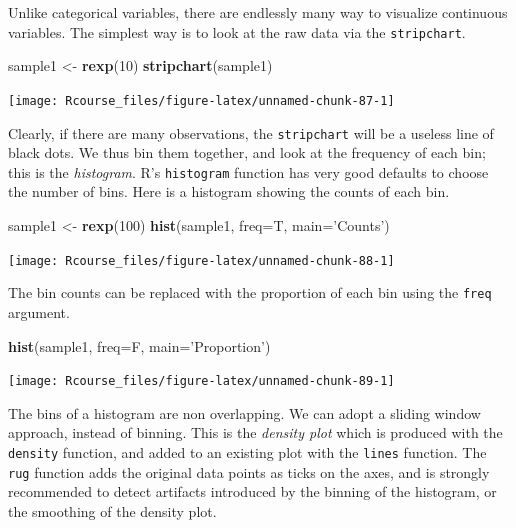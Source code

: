 \documentclass[]{book}
\newenvironment{Shaded}{\begin{snugshade}}{\end{snugshade}}
\newcommand{\KeywordTok}[1]{\textcolor[rgb]{0.13,0.29,0.53}{\textbf{#1}}}
\newcommand{\DataTypeTok}[1]{\textcolor[rgb]{0.13,0.29,0.53}{#1}}
\newcommand{\DecValTok}[1]{\textcolor[rgb]{0.00,0.00,0.81}{#1}}
\newcommand{\StringTok}[1]{\textcolor[rgb]{0.31,0.60,0.02}{#1}}
\newcommand{\NormalTok}[1]{#1}
\theoremstyle{definition}
\theoremstyle{definition}
\theoremstyle{definition}
\theoremstyle{remark}
\begin{document}
Unlike categorical variables, there are endlessly many way to visualize
continuous variables. The simplest way is to look at the raw data via
the \texttt{stripchart}.

\begin{Shaded}
\begin{Highlighting}[]
\NormalTok{sample1 <-}\StringTok{ }\KeywordTok{rexp}\NormalTok{(}\DecValTok{10}\NormalTok{)                             }
\KeywordTok{stripchart}\NormalTok{(sample1)}
\end{Highlighting}
\end{Shaded}

\texttt{[image: Rcourse\_files/figure-latex/unnamed-chunk-87-1]}

Clearly, if there are many observations, the \texttt{stripchart} will be
a useless line of black dots. We thus bin them together, and look at the
frequency of each bin; this is the \emph{histogram}. R's
\texttt{histogram} function has very good defaults to choose the number
of bins. Here is a histogram showing the counts of each bin.

\begin{Shaded}
\begin{Highlighting}[]
\NormalTok{sample1 <-}\StringTok{ }\KeywordTok{rexp}\NormalTok{(}\DecValTok{100}\NormalTok{)                            }
\KeywordTok{hist}\NormalTok{(sample1, }\DataTypeTok{freq=}\NormalTok{T, }\DataTypeTok{main=}\StringTok{'Counts'}\NormalTok{)        }
\end{Highlighting}
\end{Shaded}

\texttt{[image: Rcourse\_files/figure-latex/unnamed-chunk-88-1]}

The bin counts can be replaced with the proportion of each bin using the
\texttt{freq} argument.

\begin{Shaded}
\begin{Highlighting}[]
\KeywordTok{hist}\NormalTok{(sample1, }\DataTypeTok{freq=}\NormalTok{F, }\DataTypeTok{main=}\StringTok{'Proportion'}\NormalTok{)    }
\end{Highlighting}
\end{Shaded}

\texttt{[image: Rcourse\_files/figure-latex/unnamed-chunk-89-1]}

The bins of a histogram are non overlapping. We can adopt a sliding
window approach, instead of binning. This is the \emph{density plot}
which is produced with the \texttt{density} function, and added to an
existing plot with the \texttt{lines} function. The \texttt{rug}
function adds the original data points as ticks on the axes, and is
strongly recommended to detect artifacts introduced by the binning of
the histogram, or the smoothing of the density plot.
\end{document}

